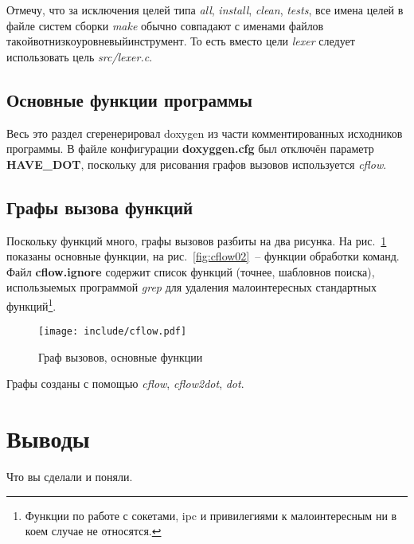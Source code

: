\documentclass[a4paper,12pt]{report}
\begin{document}
Отмечу, что за исключения целей типа \textit{all}, \textit{install}, \textit{clean}, \textit{tests}, все имена целей в файле систем сборки \textit{make} обычно совпадают с именами файлов \(такой вот низкоуровневый инструмент\). То есть вместо цели \textit{lexer} следует использовать цель \textit{src/lexer.c}.

\section{Основные функции программы}

Весь это раздел сгеренерировал doxygen из части комментированных исходников программы. В файле конфигурации \textbf{doxyggen.cfg} был отключён параметр \textbf{HAVE\_DOT}, поскольку для рисования графов вызовов используется \textit{cflow}.

% 

%
%
%
%
%
%
%
%


\section{Графы вызова функций}

Поскольку функций много, графы вызовов разбиты на два рисунка. На рис.~\ref{fig:cflow01} показаны основные функции, на рис.~\ref{fig:cflow02}~-- функции обработки команд. Файл \textbf{cflow.ignore} содержит список функций (точнее, шабловнов поиска), использыемых программой \textit{grep} для удаления малоинтересных стандартных функций\footnote{Функции по работе с сокетами, ipc и привилегиями к малоинтересным ни в коем случае не относятся.}.

\begin{figure}
\centering
\texttt{[image: include/cflow.pdf]}
\caption{Граф вызовов, основные функции}
\label{fig:cflow01}
\end{figure}

Графы созданы с помощью \textit{cflow}, \textit{cflow2dot}, \textit{dot}.

\chapter*{Выводы}

Что вы сделали и поняли.
\end{document}
